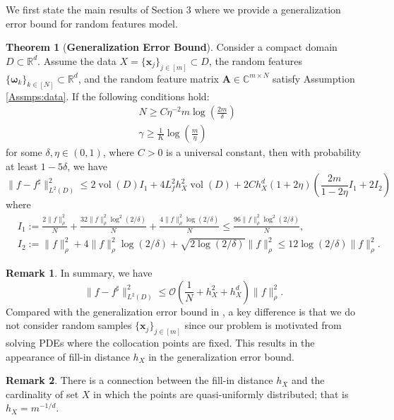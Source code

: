 \documentclass[11pt,twoside]{article}
\theoremstyle{plain}
\theoremstyle{definition}
\newtheorem{theorem}[lemma]{Theorem}
\newtheorem{remark}{Remark}
\theoremstyle{remark}
\newcommand{\R}{\mathbb{R}}
\newcommand{\C}{\mathbb{C}}
\newcommand{\Ab}{\mathbf{A}}
\newcommand{\xb}{\mathbf{x}}
\newcommand{\vol}{\mathop{\mathrm{vol}}}
\newcommand{\omegab}{\boldsymbol\omega}
\begin{document}
We first state the main results of Section 3 where we provide a generalization error bound for random features model.

\begin{theorem}[{\bf Generalization Error Bound}]
\label{main_RF}
Consider a compact domain $D\subset\R^d$. Assume the data $X = \{\xb_j\}_{j\in[m]} \subset D$, the random features $\{ \omegab_k\}_{k\in[N]} \subset\R^d$, and the random feature matrix $\Ab\in\C^{m\times N}$ satisfy Assumption \ref{Assmps:data}. If the following conditions hold:
\begin{align}
& N \geq C\eta^{-2}m\log\left(\frac{2m}{\delta}\right) \\
& \gamma \geq \frac{1}{K}\log\left(\frac{m}{\eta}\right)
\end{align}
for some $\delta,\eta\in(0,1)$, where $C>0$ is a universal constant, then with probability at least $1-5\delta$, we have
\begin{equation}
\|f - f^\sharp\|^2_{L^2(D)} \leq 2\vol(D) I_1 + 4L_f^2h_X^2\vol(D) + 2Ch_X^d(1+2\eta)\left( \frac{2m}{1-2\eta}I_1 + 2I_2 \right)
\end{equation}
where
\begin{equation*}
\begin{aligned}
&I_1 := \frac{2\|f\|_\rho^2}{N} + \frac{32\|f\|_\rho^2\log^2(2/\delta)}{N} + \frac{4\|f\|^2_\rho\log(2/\delta)}{N} \leq \frac{96\|f\|_\rho^2\log^2(2/\delta)}{N}, \\
&I_2 := \|f\|_\rho^2 + 4\|f\|_\rho^2\log(2/\delta) + \sqrt{2\log(2/\delta)}\|f\|_\rho^2 \leq 12\log(2/\delta)\|f\|_\rho^2.
\end{aligned}
\end{equation*}
\end{theorem}
\begin{remark}
In summary, we have
$$
\|f - f^\sharp\|^2_{L^2(D)} \leq \mathcal{O}\left(\frac{1}{N}+h_X^2 + h_X^d\right)\|f\|^2_\rho.
$$
Compared with the generalization error bound in \cite{chen2024conditioning}, a key difference is that we do not consider random samples $\{\xb_j\}_{j\in[m]}$ since our problem is motivated from solving PDEs where the collocation points are fixed. This results in the appearance of fill-in distance $h_X$ in the generalization error bound.
\end{remark}

\begin{remark}
There is a connection between the fill-in distance $h_X$ and the cardinality of set $X$ in which the points are quasi-uniformly distributed; that is $h_X = m^{-1/d}$.     
\end{remark}
\end{document}
